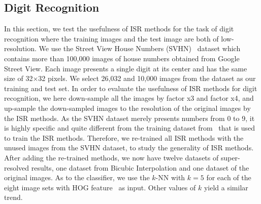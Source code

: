 \documentclass[10pt,twocolumn,letterpaper]{article}
\begin{document}




\subsection{Digit Recognition}
\label{sec:dr}


In this section, we test the usefulness of ISR methods for the task of
digit recognition where the training images and the test image are
both of low-resolution.  We use the Street View House Numbers
(SVHN)~\cite{37648} dataset which contains more than 100,000 images of
house numbers obtained from Google Street View. Each image presents a
single digit at its center and has the same size of 32$\times$32
pixels.  We select 26,032 and 10,000 images from the dataset as our
training and test set.  In order to evaluate the usefulness of ISR
methods for digit recognition, we here down-sample all the images by
factor x3 and factor x4, and up-sample the down-sampled images to the
resolution of the original images by the ISR methods.  As the SVHN
dataset merely presents numbers from 0 to 9, it is highly specific and
quite different from the training dataset from~\cite{Yang-TIP-2010}
that is used to train the ISR methods. Therefore, we re-trained all ISR methods
with the unused images from the SVHN dataset, to study the generality of ISR methods. After adding the
re-trained methods, we now have twelve datasets of super-resolved
results, one dataset from Bicubic Interpolation and one dataset of
the original images. As to the classifier, we use the $k$-NN with $k=5$ for each of the eight
image sets with HOG feature~\cite{Dalal_HoG} as input. Other values of $k$ yield a similar trend.
\end{document}
